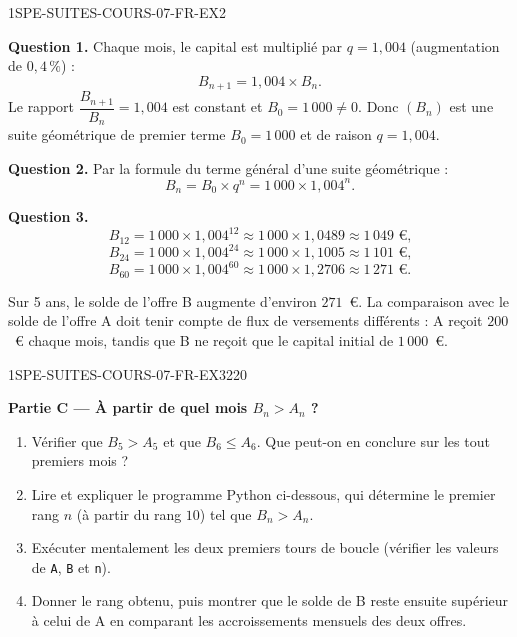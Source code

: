 \begin{corrige}{1SPE-SUITES-COURS-07-FR-EX2}


\textbf{Question 1.} Chaque mois, le capital est multiplié par $q = 1{,}004$ (augmentation de $0{,}4\,\%$) :
\[
  B_{n+1} = 1{,}004 \times B_n.
\]
Le rapport $\dfrac{B_{n+1}}{B_n} = 1{,}004$ est constant et $B_0 = 1\,000
\neq 0$. Donc $(B_n)$ est une suite géométrique de premier terme $B_0 = 1\,000$ et de raison $q = 1{,}004$.

\textbf{Question 2.} Par la formule du terme général d'une suite géométrique :
\[
  B_n = B_0 \times q^n = 1\,000 \times 1{,}004^n.
\]

\textbf{Question 3.}
\[
  B_{12} = 1\,000 \times 1{,}004^{12} \approx 1\,000 \times 1{,}0489 \approx 1\,049 \text{ €,}
\]
\[
  B_{24} = 1\,000 \times 1{,}004^{24} \approx 1\,000 \times 1{,}1005 \approx 1\,101 \text{ €,}
\]
\[
  B_{60} = 1\,000 \times 1{,}004^{60} \approx 1\,000 \times 1{,}2706 \approx 1\,271 \text{ €.}
\]

Sur 5 ans, le solde de l'offre B augmente d'environ $271$~€. La comparaison
avec le solde de l'offre A doit tenir compte de flux de versements différents :
A reçoit $200$~€ chaque mois, tandis que B ne reçoit que le capital initial de
$1\,000$~€.

\end{corrige}

\bigskip


\begin{exercice}{1SPE-SUITES-COURS-07-FR-EX3}{2}{20}

\textbf{Partie C — À partir de quel mois $B_n > A_n$ ?}

\begin{enumerate}
  \item Vérifier que $B_5 > A_5$ et que $B_6 \leqslant A_6$. Que peut-on en conclure sur les tout premiers mois ?
  \item Lire et expliquer le programme Python ci-dessous, qui détermine
  le premier rang $n$ (à partir du rang $10$) tel que $B_n>A_n$.
  \item Exécuter mentalement les deux premiers tours de boucle (vérifier les valeurs de \texttt{A}, \texttt{B} et \texttt{n}).
  \item Donner le rang obtenu, puis montrer que le solde de B reste ensuite
  supérieur à celui de A en comparant les accroissements mensuels des deux offres.
\end{enumerate}

\end{exercice}


